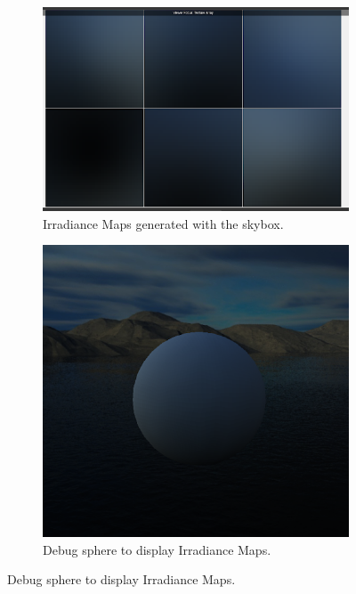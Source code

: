 \documentclass{rapportCS}
\begin{document}
\begin{figure}
    \begin{subfigure}{0.33\textwidth}
        \includegraphics[width=1\linewidth]{figures/irradiance-map-1.png}
        \caption{Irradiance Maps generated with the skybox.}
        \label{fig:subim1}
    \end{subfigure}\hfill
    \begin{subfigure}{0.33\textwidth}
        \includegraphics[width=1\linewidth]{figures/ibl-result-1.png}
        \caption{Debug sphere to display Irradiance Maps.}
        \label{fig:subim2}
    \end{subfigure}\hfill

\end{figure}
\end{document}
